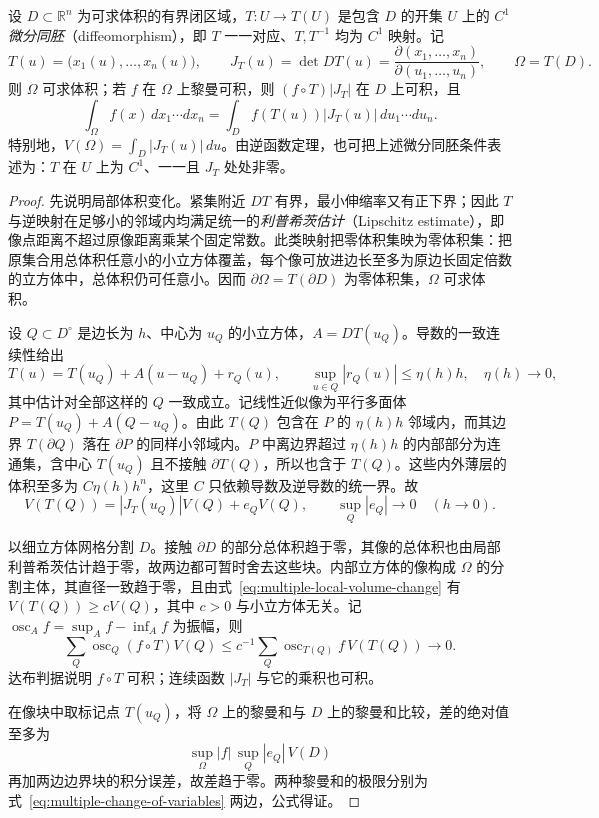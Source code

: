 \begin{theorem}[重积分的变量替换公式]
\label{thm:multiple-change-of-variables}
设 $D\subset\mathbb R^n$ 为可求体积的有界闭区域，$T:U\to T(U)$ 是包含 $D$ 的开集 $U$ 上的 $C^1$ \emph{微分同胚}（diffeomorphism），即 $T$ 一一对应、$T,T^{-1}$ 均为 $C^1$ 映射。记
\[
    T(u)=\bigl(x_1(u),\ldots,x_n(u)\bigr),\qquad
    J_T(u)=\det DT(u)=\frac{\partial(x_1,\ldots,x_n)}{\partial(u_1,\ldots,u_n)},
    \qquad \Omega=T(D).
\]
则 $\Omega$ 可求体积；若 $f$ 在 $\Omega$ 上黎曼可积，则 $(f\circ T)|J_T|$ 在 $D$ 上可积，且
\begin{equation}
    \int_\Omega f(x)\,dx_1\cdots dx_n
    =\int_D f(T(u))|J_T(u)|\,du_1\cdots du_n.
    \label{eq:multiple-change-of-variables}
\end{equation}
特别地，$V(\Omega)=\int_D|J_T(u)|\,du$。由逆函数定理，也可把上述微分同胚条件表述为：$T$ 在 $U$ 上为 $C^1$、一一且 $J_T$ 处处非零。
\end{theorem}
\begin{proof}
先说明局部体积变化。紧集附近 $DT$ 有界，最小伸缩率又有正下界；因此 $T$ 与逆映射在足够小的邻域内均满足统一的\emph{利普希茨估计}（Lipschitz estimate），即像点距离不超过原像距离乘某个固定常数。此类映射把零体积集映为零体积集：把原集合用总体积任意小的小立方体覆盖，每个像可放进边长至多为原边长固定倍数的立方体中，总体积仍可任意小。因而 $\partial\Omega=T(\partial D)$ 为零体积集，$\Omega$ 可求体积。

设 $Q\subset D^\circ$ 是边长为 $h$、中心为 $u_Q$ 的小立方体，$A=DT(u_Q)$。导数的一致连续性给出
\[
    T(u)=T(u_Q)+A(u-u_Q)+r_Q(u),\qquad
    \sup_{u\in Q}|r_Q(u)|\leq\eta(h)h,\quad \eta(h)\to0,
\]
其中估计对全部这样的 $Q$ 一致成立。记线性近似像为平行多面体 $P=T(u_Q)+A(Q-u_Q)$。由此 $T(Q)$ 包含在 $P$ 的 $\eta(h)h$ 邻域内，而其边界 $T(\partial Q)$ 落在 $\partial P$ 的同样小邻域内。$P$ 中离边界超过 $\eta(h)h$ 的内部部分为连通集，含中心 $T(u_Q)$ 且不接触 $\partial T(Q)$，所以也含于 $T(Q)$。这些内外薄层的体积至多为 $C\eta(h)h^n$，这里 $C$ 只依赖导数及逆导数的统一界。故
\begin{equation}
    V(T(Q))=|J_T(u_Q)|V(Q)+e_QV(Q),
    \qquad \sup_Q|e_Q|\to0\quad(h\to0).
    \label{eq:multiple-local-volume-change}
\end{equation}

以细立方体网格分割 $D$。接触 $\partial D$ 的部分总体积趋于零，其像的总体积也由局部利普希茨估计趋于零，故两边都可暂时舍去这些块。内部立方体的像构成 $\Omega$ 的分割主体，其直径一致趋于零，且由式~\eqref{eq:multiple-local-volume-change} 有 $V(T(Q))\geq cV(Q)$，其中 $c>0$ 与小立方体无关。记 $\operatorname{osc}_Af=\sup_Af-\inf_Af$ 为振幅，则
\[
    \sum_Q\operatorname{osc}_Q(f\circ T)V(Q)
    \leq c^{-1}\sum_Q\operatorname{osc}_{T(Q)}f\,V(T(Q))\to0.
\]
达布判据说明 $f\circ T$ 可积；连续函数 $|J_T|$ 与它的乘积也可积。

在像块中取标记点 $T(u_Q)$，将 $\Omega$ 上的黎曼和与 $D$ 上的黎曼和比较，差的绝对值至多为
\[
    \sup_\Omega|f|\,\sup_Q|e_Q|\,V(D)
\]
再加两边边界块的积分误差，故差趋于零。两种黎曼和的极限分别为式~\eqref{eq:multiple-change-of-variables} 两边，公式得证。
\end{proof}

